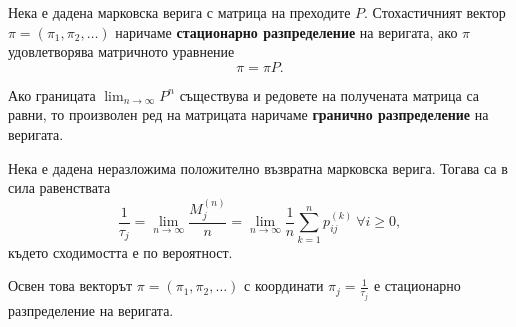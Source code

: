 \documentclass[numbers=endperiod, bibliography=totocnumbered]{scrartcl}
\begin{document}
\begin{definition}
  Нека е дадена марковска верига с матрица на преходите \( P \). Стохастичният вектор \( \pi = (\pi_1, \pi_2, \ldots) \) наричаме \textbf{стационарно разпределение} на веригата, ако \( \pi \) удовлетворява матричното уравнение
  \begin{equation*}
    \pi = \pi P.
  \end{equation*}

  Ако границата \( \lim_{n \to \infty} P^n \) съществува и редовете на получената матрица са равни, то произволен ред на матрицата наричаме \textbf{гранично разпределение} на веригата.
\end{definition}

\begin{theorem}
  Нека е дадена неразложима положително възвратна марковска верига. Тогава са в сила равенствата
  \begin{equation*}
    \frac 1 {\tau_j}
    =
    \lim_{n \to \infty} \frac {M^{(n)}_j} n
    =
    \lim_{n \to \infty} \frac 1 n \sum_{k=1}^n p_{ij}^{(k)}~\forall i \geq 0,
  \end{equation*}
  където сходимостта е по вероятност.

  Освен това векторът \( \pi = (\pi_1, \pi_2, \ldots) \) с координати \( \pi_j = \frac 1 {\tau_j} \) е стационарно разпределение на веригата.
\end{theorem}
\end{document}
